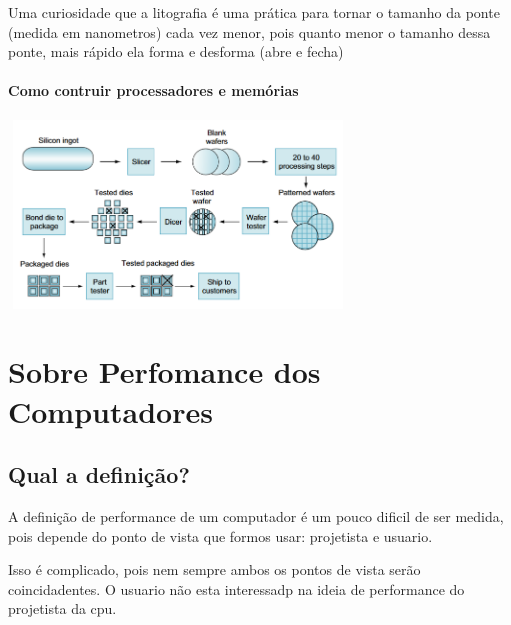 \documentclass[12pt,a4paper]{report}
\begin{document}
	Uma curiosidade que a litografia é uma prática para tornar o tamanho da ponte (medida em nanometros) cada vez menor, pois quanto menor o tamanho dessa ponte, mais rápido ela forma e desforma (abre e fecha)
	
	\subsubsection{Como contruir processadores e memórias}
	
	\begin{center}
		
		\includegraphics[width=9cm,height=5cm,keepaspectratio=false]{imagens-teoria/construir_process.png}
		
	\end{center}
	
	\chapter{Sobre Perfomance dos Computadores}
	
	\section{Qual a definição?}
	A definição de performance de um computador é um pouco dificil de ser medida, pois depende do ponto de vista que formos usar: projetista e usuario.
	
	Isso é complicado, pois nem sempre ambos os pontos de vista serão coincidadentes. O usuario não esta interessadp na ideia de performance do projetista da cpu.
	
	
\end{document}
